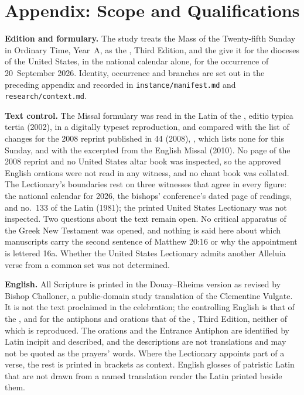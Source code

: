 \section{Appendix: Scope and Qualifications}
\label{sec:scope}

{\small
\textbf{Edition and formulary.} The study treats the Mass of the Twenty-fifth
Sunday in Ordinary Time, Year~A, as the , Third Edition, and
the  give it for the dioceses of the United States,
in the national calendar alone, for the occurrence of 20~September 2026.
Identity, occurrence and branches are set out in the preceding appendix and
recorded in \texttt{instance/manifest.md} and \texttt{research/context.md}.

\textbf{Text control.} The Missal formulary was read in the Latin of the
, editio typica tertia (2002), in a digitally typeset
reproduction, and compared with the list of changes for the 2008 reprint
published in  44 (2008), , which
lists none for this Sunday, and with the  excerpted from the
English Missal (2010). No page of the 2008 reprint and no United States altar
book was inspected, so the approved English orations were not read in any
witness, and no chant book was collated. The Lectionary's boundaries rest on
three witnesses that agree in every figure: the national calendar for 2026,
the bishops' conference's dated page of readings, and no.~133 of the Latin
 (1981); the printed United States Lectionary was
not inspected. Two questions about the text remain open. No critical apparatus
of the Greek New Testament was opened, and nothing is said here about which
manuscripts carry the second sentence of Matthew 20:16 or why the appointment
is lettered 16a. Whether the United States Lectionary admits another Alleluia
verse from a common set was not determined.

\textbf{English.} All Scripture is printed in the Douay--Rheims version as
revised by Bishop Challoner, a public-domain study translation of the
Clementine Vulgate. It is not the text proclaimed in the celebration; the
controlling English is that of the , and for the antiphons and orations
that of the , Third Edition, neither of which is reproduced.
The orations and the Entrance Antiphon are identified by Latin incipit and
described, and the descriptions are not translations and may not be quoted as
the prayers' words. Where the Lectionary appoints part of a verse, the rest is
printed in brackets as context. English glosses of patristic Latin that are
not drawn from a named translation render the Latin printed beside them.

}
